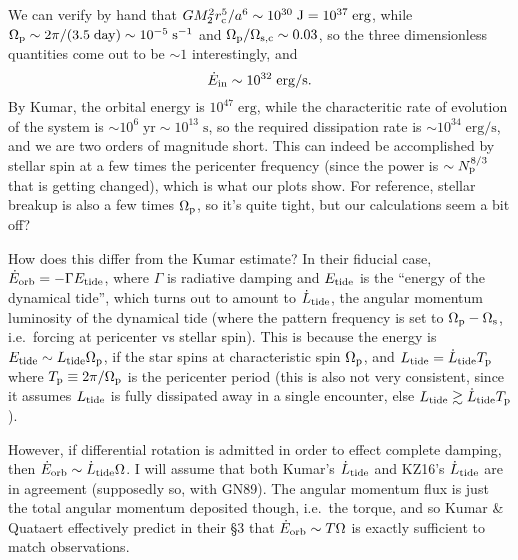 \documentclass[11pt,
        usenames, %
        dvipsnames %
    ]{article}
\newcommand*{\s}[1]{\left[#1\right]}
\begin{document}
We can verify by hand that $GM_2^2r_{\rm c}^5 / a^6 \sim 10^{30} \;\mathrm{J} =
10^{37}\;\mathrm{erg}$, while $\Omega_{\rm p} \sim 2\pi / (3.5 \;\mathrm{day})
\sim 10^{-5}\;\mathrm{s^{-1}}$ and $\Omega_{\rm p} / \Omega_{\rm s, c}
\sim 0.03$, so the three dimensionless quantities come out to be $\sim 1$
interestingly, and
\begin{equation}
    \dot{E}_{\rm in} \sim 10^{32}\;\mathrm{erg/s}.
\end{equation}
By Kumar, the orbital energy is $10^{47}\;\mathrm{erg}$, while the characteritic
rate of evolution of the system is $\sim 10^6\;\mathrm{yr} \sim
10^{13}\;\mathrm{s}$, so the required dissipation rate is $\sim
10^{34}\;\mathrm{erg/s}$, and we are two orders of magnitude short. This can
indeed be accomplished by stellar spin at a few times the pericenter frequency
(since the power is $\sim N_{\rm p}^{8/3}$ that is getting changed), which is
what our plots show. For reference, stellar breakup is also a few times
$\Omega_{\rm p}$, so it's quite tight, but our calculations seem a bit off?

How does this differ from the Kumar estimate? In their fiducial case,
$\dot{E}_{\rm orb} = -\Gamma E_{\rm tide}$, where $\Gamma$ is radiative damping
and $E_{\rm tide}$ is the ``energy of the dynamical tide'', which turns out to
amount to $\dot{L}_{\rm tide}$, the angular momentum luminosity of the dynamical
tide (where the pattern frequency is set to $\Omega_{\rm p} - \Omega_{\rm s}$,
i.e.\ forcing at pericenter vs stellar spin). This is because the energy is
$E_{\rm tide} \sim L_{\rm tide} \Omega_{\rm p}$, if the star spins at
characteristic spin $\Omega_{\rm p}$, and $L_{\rm tide} = \dot{L}_{\rm tide}
T_{\rm p}$ where $T_{\rm p} \equiv 2\pi / \Omega_{\rm p}$ is the pericenter
period (this is also not very consistent, since it assumes $L_{\rm tide}$ is
fully dissipated away in a single encounter, else $L_{\rm tide} \gtrsim
\dot{L}_{\rm tide} T_{\rm p}$).

However, if differential rotation is admitted in order to effect complete
damping, then $\dot{E}_{\rm orb} \sim \dot{L}_{\rm tide} \Omega$. I will assume
that both Kumar's $\dot{L}_{\rm tide}$ and KZ16's $\dot{L}_{\rm tide}$ are in
agreement (supposedly so, with GN89). The angular momentum flux is just the
total angular momentum deposited though, i.e.\ the torque, and so Kumar \&
Quataert effectively predict in their \S3 that $\dot{E}_{\rm orb} \sim T
\Omega$ is exactly sufficient to match observations.
\end{document}
